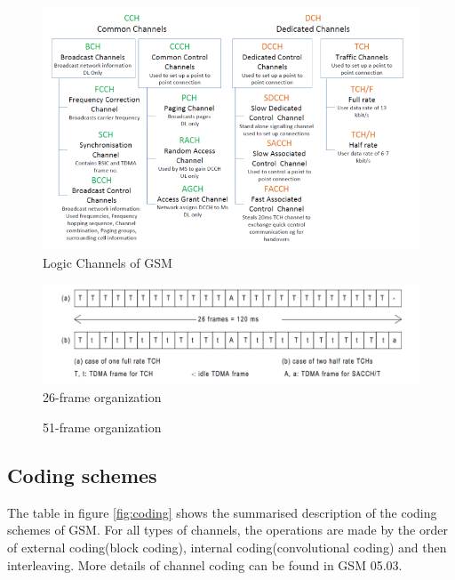 \documentclass[a4paper,12pt,oneside]{article}
\begin{document}
\begin{figure}[h]
\centering\includegraphics[width=5in]{figure/log_ch.png}
\caption{Logic Channels of GSM \label{fig:2} \cite{glendrange2010decoding}}
\end{figure}
\begin{figure}[h]
\centering\includegraphics[width=5in]{figure/26frames.png}
\caption{ 26-frame organization\label{fig:26f} \cite{etsi199203}}
\end{figure}

\newpage
\begin{figure}[h]

\caption{ 51-frame organization\label{fig:51f} \cite{etsi199203}}
\end{figure}

\newpage


\subsection{Coding schemes}
The table in figure \ref{fig:coding} shows the summarised description of the coding schemes of GSM.
For all types of channels, the operations are made by the order of external coding(block coding), internal
coding(convolutional coding) and then interleaving. More details of channel coding can be found in GSM 05.03\cite{etsi199203_chn}.
\end{document}
